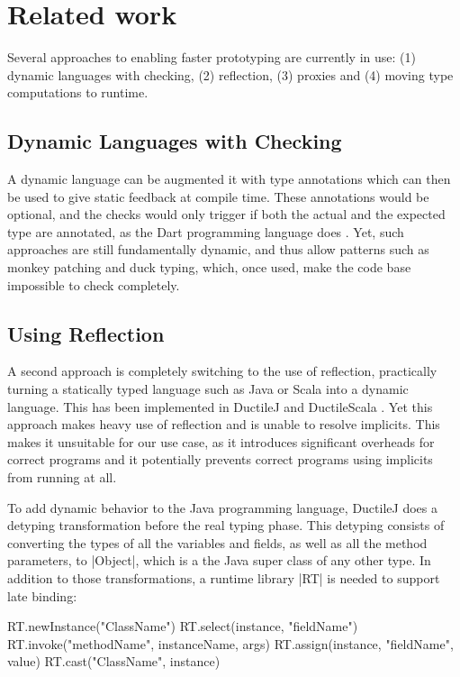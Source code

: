 \section{Related work}

Several approaches to enabling faster prototyping are currently in use: (1) dynamic languages with checking, (2) reflection, (3) proxies and (4) moving type computations to runtime.

\subsection{Dynamic Languages with Checking}

A dynamic language can be augmented it with type annotations which can then be used to give static feedback at compile time. These annotations would be optional, and the checks would only trigger if both the actual and the expected type are annotated, as the Dart programming language does \cite{dart}. Yet, such approaches are still fundamentally dynamic, and thus allow patterns such as monkey patching and duck typing, which, once used, make the code base impossible to check completely.

\subsection{Using Reflection}

A second approach is completely switching to the use of reflection, practically turning a statically typed language such as Java or Scala into a dynamic language. This has been implemented in DuctileJ and DuctileScala \cite{ductilej,ductilescala}. Yet this approach makes heavy use of reflection and is unable to resolve implicits. This makes it unsuitable for our use case, as it introduces significant overheads for correct programs and it potentially prevents correct programs using implicits from running at all.

To add dynamic behavior to the Java programming language, DuctileJ \cite{ductilej} does a detyping transformation before the real typing phase. This detyping consists of converting the types of all the variables and fields, as well as all the method parameters, to |Object|, which is a the Java super class of any other type. In addition to those transformations, a runtime library |RT| is needed to support late binding:

\begin{lstlisting-nobreak}
RT.newInstance("ClassName")
RT.select(instance, "fieldName")
RT.invoke("methodName", instanceName, args)
RT.assign(instance, "fieldName", value)
RT.cast("ClassName", instance)
\end{lstlisting-nobreak}


